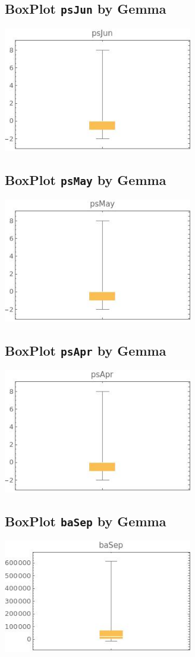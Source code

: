 \documentclass[a4paper]{article}
\begin{document}
\subsection{BoxPlot {\tt psJun} by Gemma}
\includegraphics[width=0.62\textwidth]{imgs/psJun.jpeg}

\subsection{BoxPlot {\tt psMay} by Gemma}
\includegraphics[width=0.62\textwidth]{imgs/psMay.jpeg}

\subsection{BoxPlot {\tt psApr} by Gemma}
\includegraphics[width=0.62\textwidth]{imgs/psApr.jpeg}


\subsection{BoxPlot {\tt baSep} by Gemma}
\includegraphics[width=0.62\textwidth]{imgs/baSep.jpeg}
\end{document}
